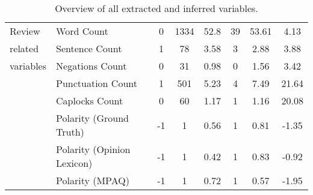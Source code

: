 \documentclass[
	a4paper,
	pdftex,
	12pt,	
	footinclude=true,
	fleqn,
	final,
	]{report}%
\begin{document}
\begin{table}[h]
\begin{tabular}{llcccccc}
Review    & Word Count                 & 0    & 1334 & 52.8    & 39   & 53.61    & 4.13     \\
related   & Sentence Count             & 1    & 78   & 3.58    & 3    & 2.88     & 3.88     \\
variables & Negations Count            & 0    & 31   & 0.98    & 0    & 1.56     & 3.42     \\
          & Punctuation Count          & 1    & 501  & 5.23    & 4    & 7.49     & 21.64    \\
          & Caplocks Count             & 0    & 60   & 1.17    & 1    & 1.16     & 20.08    \\
          & Polarity (Ground Truth)    & -1   & 1    & 0.56    & 1    & 0.81     & -1.35    \\
          & Polarity (Opinion Lexicon) & -1   & 1    & 0.42    & 1    & 0.83     & -0.92    \\
          & Polarity (MPAQ)            & -1   & 1    & 0.72    & 1    & 0.57     & -1.95    \\ \bottomrule
\end{tabular}
\caption[Overview of all extracted and inferred variables.]{\small \centering Overview of all extracted and inferred variables.}
\label{t:variables_all}
\end{table}
\end{document}
